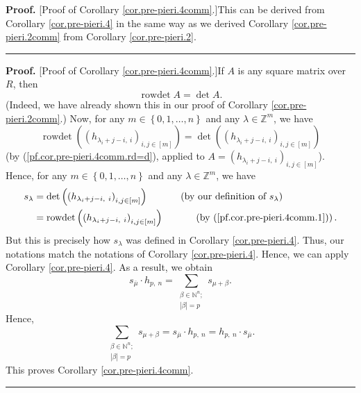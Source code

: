\documentclass
[numbers=enddot,12pt,final,onecolumn,notitlepage,english]{scrartcl}%
\theoremstyle{definition}
\newenvironment{proof}[1][Proof]{\noindent\textbf{#1.} }{\ \rule{0.5em}{0.5em}}
\let\sumnonlimits\sum
\renewcommand{\sum}{\sumnonlimits\limits}
\newenvironment{verlong}{}{}
\newenvironment{vershort}{}{}
\begin{document}
\begin{vershort}
\begin{proof}
[Proof of Corollary \ref{cor.pre-pieri.4comm}.]This can be derived from
Corollary \ref{cor.pre-pieri.4} in the same way as we derived Corollary
\ref{cor.pre-pieri.2comm} from Corollary \ref{cor.pre-pieri.2}.
\end{proof}
\end{vershort}

\begin{verlong}
\begin{proof}
[Proof of Corollary \ref{cor.pre-pieri.4comm}.]If $A$ is any square matrix
over $R$, then%
\begin{equation}
\operatorname*{rowdet}A=\det A. \label{pf.cor.pre-pieri.4comm.rd=d}%
\end{equation}
(Indeed, we have already shown this in our proof of Corollary
\ref{cor.pre-pieri.2comm}.) Now, for any $m\in\left\{  0,1,\ldots,n\right\}  $
and any $\lambda\in\mathbb{Z}^{m}$, we have%
\begin{equation}
\operatorname*{rowdet}\left(  \left(  h_{\lambda_{i}+j-i,\ i}\right)
_{i,j\in\left[  m\right]  }\right)  =\det\left(  \left(  h_{\lambda
_{i}+j-i,\ i}\right)  _{i,j\in\left[  m\right]  }\right)
\label{pf.cor.pre-pieri.4comm.1}%
\end{equation}
(by (\ref{pf.cor.pre-pieri.4comm.rd=d}), applied to $A=\left(  h_{\lambda
_{i}+j-i,\ i}\right)  _{i,j\in\left[  m\right]  }$). Hence, for any
$m\in\left\{  0,1,\ldots,n\right\}  $ and any $\lambda\in\mathbb{Z}^{m}$, we
have%
\begin{align*}
s_{\lambda}  &  =\det\left(  \left(  h_{\lambda_{i}+j-i,\ i}\right)
_{i,j\in\left[  m\right]  }\right)  \ \ \ \ \ \ \ \ \ \ \left(  \text{by our
definition of }s_{\lambda}\right) \\
&  =\operatorname*{rowdet}\left(  \left(  h_{\lambda_{i}+j-i,\ i}\right)
_{i,j\in\left[  m\right]  }\right)  \ \ \ \ \ \ \ \ \ \ \left(  \text{by
(\ref{pf.cor.pre-pieri.4comm.1})}\right)  .
\end{align*}
But this is precisely how $s_{\lambda}$ was defined in Corollary
\ref{cor.pre-pieri.4}. Thus, our notations match the notations of Corollary
\ref{cor.pre-pieri.4}. Hence, we can apply Corollary \ref{cor.pre-pieri.4}. As
a result, we obtain%
\[
s_{\overline{\mu}}\cdot h_{p,\ n}=\sum_{\substack{\beta\in\mathbb{N}%
^{n};\\\left\vert \beta\right\vert =p}}s_{\mu+\beta}.
\]
Hence,%
\[
\sum_{\substack{\beta\in\mathbb{N}^{n};\\\left\vert \beta\right\vert
=p}}s_{\mu+\beta}=s_{\overline{\mu}}\cdot h_{p,\ n}=h_{p,\ n}\cdot
s_{\overline{\mu}}.
\]
This proves Corollary \ref{cor.pre-pieri.4comm}.
\end{proof}
\end{verlong}
\end{document}
